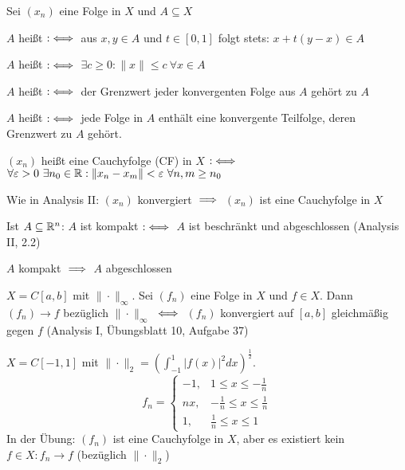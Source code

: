 \documentclass[a4paper,twoside,DIV15,BCOR12mm]{scrbook}
\begin{document}
\begin{definition}
Sei $(x_n)$ eine Folge in $X$ und $A\subseteq X$
\begin{liste}
\item $A$ heißt  $:\iff$ aus $x,y\in A$ und $t\in[0,1]$ folgt stets: $x+t(y-x) \in A$
\item $A$ heißt  $:\iff$ $\exists c\ge0: \|x\|\le c \ \forall x\in A$
\item $A$ heißt  $:\iff$ der Grenzwert jeder konvergenten Folge aus $A$ gehört zu $A$
\item $A$ heißt  $:\iff$ jede Folge in $A$ enthält eine konvergente Teilfolge, deren Grenzwert zu $A$ gehört.
\item $(x_n)$ heißt eine Cauchyfolge (CF) in $X$ $:\iff$\\ $\forall \varepsilon>0 \ \exists n_0\in\mathbb{R}: \|x_n-x_m\|<\varepsilon \ \forall n,m\ge n_0$
\end{liste}
\end{definition}

\begin{bemerkung}
\begin{liste}
\item Wie in Analysis II: $(x_n)$ konvergiert $\implies$ $(x_n)$ ist eine Cauchyfolge in $X$
\item Ist $A\subseteq \mathbb{R}^n$: $A$ ist kompakt $:\iff$ $A$ ist beschränkt und abgeschlossen (Analysis II, 2.2)
\item $A$ kompakt $\implies$ $A$ abgeschlossen
\item $X=C[a,b]$ mit $\|\cdot\|_\infty$. Sei $(f_n)$ eine Folge in $X$ und $f\in X$. Dann $(f_n) \to f$ bezüglich $\|\cdot\|_\infty$ $\iff$ $(f_n)$ konvergiert auf $[a,b]$ gleichmäßig gegen $f$ (Analysis  I, Übungsblatt 10, Aufgabe 37)
\end{liste}
\end{bemerkung}

\begin{beispiel}
$X=C[-1,1]$ mit $\|\cdot\|_2 = \left(\int_{-1}^1|f(x)|^2dx\right)^\frac12$.
\[f_n=
\begin{cases}
-1, & 1\le x\le -\frac1n \\
nx, & -\frac1n \le x \le \frac1n \\
1, & \frac1n \le x \le 1
\end{cases}\]
In der Übung: $(f_n)$ ist eine Cauchyfolge in $X$, aber es existiert kein $f\in X: f_n\to f$ (bezüglich $\|\cdot\|_2$)
\end{beispiel}
\end{document}
